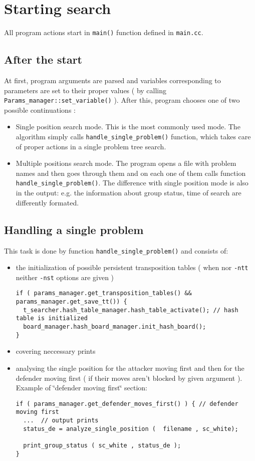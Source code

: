 \section{Starting search}\label{page_2}
All program actions start in {\tt main()} function defined in {\tt main.cc}. \subsection{After the start}\label{page_2_page_2__sec_1}
At first, program arguments are parsed and variables corresponding to parameters are set to their proper values ( by calling {\tt Params\_\-manager::set\_\-variable()} ). After this, program chooses one of two possible continuations :\begin{itemize}
\item Single position search mode. This is the most commonly used mode. The algorithm simply calls {\tt handle\_\-single\_\-problem()} function, which takes care of proper actions in a single problem tree search.\item Multiple positions search mode. The program opens a file with problem names and then goes through them and on each one of them calls function {\tt handle\_\-single\_\-problem()}. The difference with single position mode is also in the output: e.g. the information about group status, time of search are differently formated.\end{itemize}
\subsection{Handling a single problem}\label{page_2_page_2__sec_2}
This task is done by function {\tt handle\_\-single\_\-problem()} and consists of:\begin{itemize}
\item the initialization of possible persistent transposition tables ( when nor {\tt -ntt} neither {\tt -nst} options are given ) 

\footnotesize\begin{verbatim}if ( params_manager.get_transposition_tables() && params_manager.get_save_tt()) { 
  t_searcher.hash_table_manager.hash_table_activate(); // hash table is initialized
  board_manager.hash_board_manager.init_hash_board();   
}
\end{verbatim}
\normalsize
\item covering neccessary prints\item analysing the single position for the attacker moving first and then for the defender moving first ( if their moves aren't blocked by given argument ). Example of \char`\"{}defender moving first\char`\"{} section: 

\footnotesize\begin{verbatim}if ( params_manager.get_defender_moves_first() ) { // defender moving first 
  ...  // output prints
  status_de = analyze_single_position (  filename , sc_white);

  print_group_status ( sc_white , status_de );
}
\end{verbatim}
\normalsize
\end{itemize}
